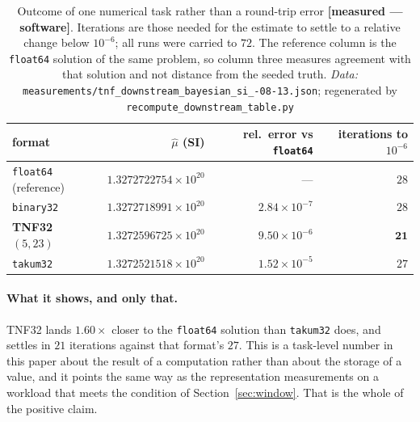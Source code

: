 \begin{table}[t]\centering
\caption{Outcome of one numerical task rather than a round-trip error
\textbf{[measured --- software]}. Iterations are those needed for the estimate to
settle to a relative change below $10^{-6}$; all runs were carried to $72$.
The reference column is the \texttt{float64} solution of the same problem, so
column three measures agreement with that solution and not distance from the
seeded truth. \emph{Data:} \texttt{measurements/\allowbreak tnf\_\allowbreak downstream\_\allowbreak bayesian\_\allowbreak si\_-08-13.json}; regenerated by \texttt{recompute\_\allowbreak downstream\_\allowbreak table.py}}
\label{tab:downstream}
\begin{tabular}{lrrr}
\toprule
format & $\hat\mu$ (SI) & rel.\ error vs \texttt{float64} & iterations to $10^{-6}$ \\
\midrule
\texttt{float64} (reference) & $1.3272722754\times 10^{20}$ & --- & $28$ \\
\texttt{binary32}            & $1.3272718991\times 10^{20}$ & $2.84\times 10^{-7}$ & $28$ \\
\textbf{TNF32 $(5,23)$}      & $1.3272596725\times 10^{20}$ & $9.50\times 10^{-6}$ & $\mathbf{21}$ \\
\texttt{takum32}             & $1.3272521518\times 10^{20}$ & $1.52\times 10^{-5}$ & $27$ \\
\bottomrule
\end{tabular}
\end{table}

\paragraph{What it shows, and only that.} TNF32 lands $1.60\times$ closer to the
\texttt{float64} solution than \texttt{takum32} does, and settles in $21$
iterations against that format's $27$. This is a task-level number in this paper
about the result of a computation rather than about the storage of a value, and it
points the same way as the representation measurements on a workload that meets
the condition of Section~\ref{sec:window}. That is the whole of the positive
claim.

